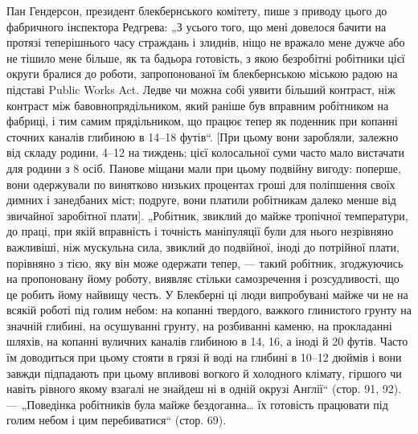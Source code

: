 Пан Гендерсон, президент блекбернського комітету, пише
з приводу цього до фабричного інспектора Редгрева: „З усього
того, що мені довелося бачити на протязі теперішнього часу
страждань і злиднів, ніщо не вражало мене дужче або не тішило
мене більше, як та бадьора готовість, з якою безробітні
робітники цієї округи бралися до роботи, запропонованої їм
блекбернською міською радою на підставі Public Works Act.
Ледве чи можна собі уявити більший контраст, ніж контраст
між бавовнопрядільником, який раніше був вправним робітником
на фабриці, і тим самим прядільником, що працює тепер як
поденник при копанні сточних каналів глибиною в 14--18 футів“.
[При цьому вони заробляли, залежно від складу родини, 4--12 на тиждень; цієї колосальної суми часто мало вистачати
для родини з 8 осіб. Панове міщани мали при цьому подвійну
вигоду: поперше, вони одержували по винятково низьких
процентах гроші для поліпшення своїх димних і занедбаних
міст; подруге, вони платили робітникам далеко менше від звичайної
заробітної плати]. „Робітник, звиклий до майже тропічної
температури, до праці, при якій вправність і точність маніпуляції
були для нього незрівняно важливіші, ніж мускульна сила,
звиклий до подвійної, іноді до потрійної плати, порівняно з тією,
яку він може одержати тепер, — такий робітник, згоджуючись
на пропоновану йому роботу, виявляє стільки самозречення
і розсудливості, що це робить йому найвищу честь. У Блекберні
ці люди випробувані майже чи не на всякій роботі під голим
небом: на копанні твердого, важкого глинистого грунту на
значній глибині, на осушуванні грунту, на розбиванні каменю,
на прокладанні шляхів, на копанні вуличних каналів глибиною
в 14, 16, а іноді й 20 футів. Часто їм доводиться при цьому
стояти в грязі й воді на глибині в 10--12 дюймів і вони завжди
підпадають при цьому впливові вогкого й холодного клімату,
гіршого чи навіть рівного якому взагалі не знайдеш ні в одній
окрузі Англії“ (стор. 91, 92). — „Поведінка робітників була майже
бездоганна\dots{} їх готовість працювати під голим небом і цим
перебиватися“ (стор. 69).


